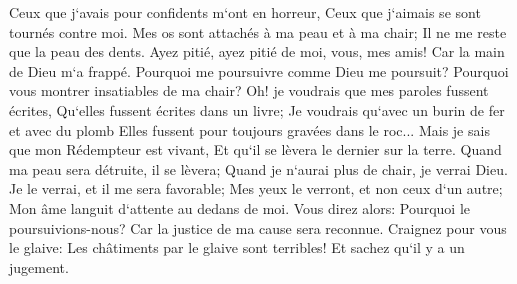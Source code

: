 \verse Ceux que j`avais pour confidents m`ont en horreur, Ceux que j`aimais se sont tournés contre moi. 
\verse Mes os sont attachés à ma peau et à ma chair; Il ne me reste que la peau des dents. 
\verse Ayez pitié, ayez pitié de moi, vous, mes amis! Car la main de Dieu m`a frappé. 
\verse Pourquoi me poursuivre comme Dieu me poursuit? Pourquoi vous montrer insatiables de ma chair? 
\verse Oh! je voudrais que mes paroles fussent écrites, Qu`elles fussent écrites dans un livre; 
\verse Je voudrais qu`avec un burin de fer et avec du plomb Elles fussent pour toujours gravées dans le roc... 
\verse Mais je sais que mon Rédempteur est vivant, Et qu`il se lèvera le dernier sur la terre. 
\verse Quand ma peau sera détruite, il se lèvera; Quand je n`aurai plus de chair, je verrai Dieu. 
\verse Je le verrai, et il me sera favorable; Mes yeux le verront, et non ceux d`un autre; Mon âme languit d`attente au dedans de moi. 
\verse Vous direz alors: Pourquoi le poursuivions-nous? Car la justice de ma cause sera reconnue. 
\verse Craignez pour vous le glaive: Les châtiments par le glaive sont terribles! Et sachez qu`il y a un jugement. 

